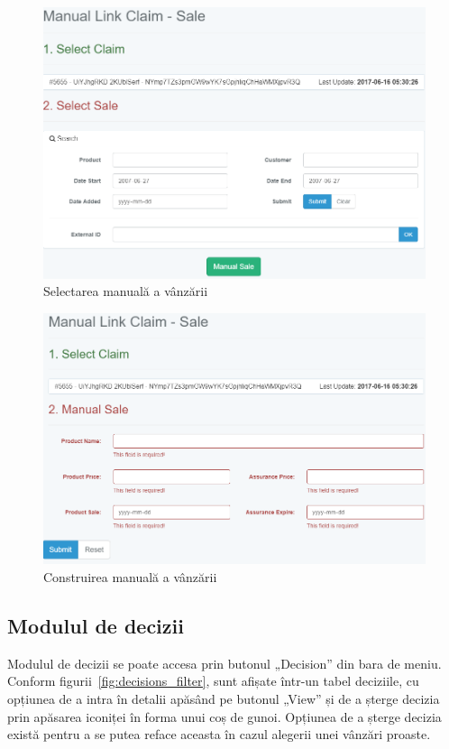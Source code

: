 	\begin{figure}
		\includegraphics[width=\linewidth]{../imagini/claims_match_sale.png}
		\caption{Selectarea manuală a vânzării}
		\label{fig:claims_match_sale}
	\end{figure}

	\begin{figure}
		\includegraphics[width=\linewidth]{../imagini/claims_manual_sale.png}
		\caption{Construirea manuală a vânzării}
		\label{fig:claims_manual_sale}
	\end{figure}


	\subsection{Modulul de decizii}

		Modulul de decizii se poate accesa prin butonul „Decision” din bara de meniu.
		Conform figurii~\ref{fig:decisions_filter}, sunt afișate într-un tabel deciziile, cu opțiunea de a intra în detalii apăsând pe butonul „View” și de a șterge decizia prin apăsarea iconiței în forma unui coș de gunoi.
		Opțiunea de a șterge decizia există pentru a se putea reface aceasta în cazul alegerii unei vânzări proaste.

